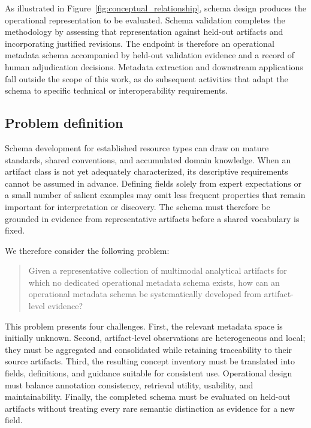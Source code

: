 \documentclass{article}
\begin{document}
As illustrated in Figure~\ref{fig:conceptual_relationship}, schema design produces the operational representation to be evaluated. Schema validation completes the methodology by assessing that representation against held-out artifacts and incorporating justified revisions. The endpoint is therefore an operational metadata schema accompanied by held-out validation evidence and a record of human adjudication decisions. Metadata extraction and downstream applications fall outside the scope of this work, as do subsequent activities that adapt the schema to specific technical or interoperability requirements.

\subsection{Problem definition}

Schema development for established resource types can draw on mature standards, shared conventions, and accumulated domain knowledge. When an artifact class is not yet adequately characterized, its descriptive requirements cannot be assumed in advance. Defining fields solely from expert expectations or a small number of salient examples may omit less frequent properties that remain important for interpretation or discovery. The schema must therefore be grounded in evidence from representative artifacts before a shared vocabulary is fixed.

We therefore consider the following problem:

\begin{quote}
Given a representative collection of multimodal analytical artifacts for which no dedicated operational metadata schema exists, how can an operational metadata schema be systematically developed from artifact-level evidence?
\end{quote}

This problem presents four challenges. First, the relevant metadata space is initially unknown. Second, artifact-level observations are heterogeneous and local; they must be aggregated and consolidated while retaining traceability to their source artifacts. Third, the resulting concept inventory must be translated into fields, definitions, and guidance suitable for consistent use. Operational design must balance annotation consistency, retrieval utility, usability, and maintainability. Finally, the completed schema must be evaluated on held-out artifacts without treating every rare semantic distinction as evidence for a new field.
\end{document}
